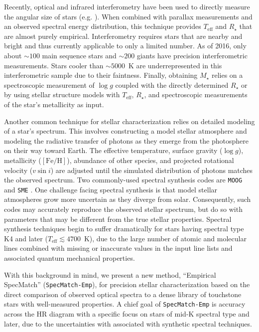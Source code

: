 \documentclass[preprint2]{aastex6}
\newcommand{\SpecMatch}{\texttt{SpecMatch-Emp}\xspace}
\newcommand{\Mstar}{\ensuremath{M_{\star}}\xspace}
\newcommand{\Rstar}{\ensuremath{R_{\star}}\xspace}
\newcommand{\fe}{\ensuremath{\mathrm{[Fe/H]}}\xspace}
\newcommand{\teff}{\ensuremath{T_{\mathrm{eff}}}\xspace}
\newcommand{\logg}{\ensuremath{\log g}\xspace}
\newcommand{\vsini}{\ensuremath{v \sin i}\xspace}
\begin{document}
Recently, optical and infrared interferometry have been used to directly measure the angular size of stars (e.g. \citealp{VonBraun14}). When combined with parallax measurements and an observed spectral energy distribution, this technique provides \teff and \Rstar that are almost purely empirical. Interferometry requires stars that are nearby and bright and thus currently applicable to only a limited number. As of 2016, only about $\sim100$ main sequence stars and $\sim200$ giants have precision interferometric measurements. Stars cooler than $\sim5000$~K are underrepresented in this interferometric sample due to their faintness. Finally, obtaining \Mstar relies on a spectroscopic measurement of \logg coupled with the directly determined \Rstar or by using stellar structure models with \teff, \Rstar, and spectroscopic measurements of the star's metallicity as input.

Another common technique for stellar characterization relies on detailed modeling of a star's spectrum. This involves constructing a model stellar atmosphere and modeling the radiative transfer of photons as they emerge from the photosphere on their way toward Earth. The effective temperature, surface gravity (\logg), metallicity (\fe), abundance of other species, and projected rotational velocity (\vsini) are adjusted until the simulated distribution of photons matches the observed spectrum. Two commonly-used spectral synthesis codes are {\tt MOOG} \citep{Sneden73} and {\tt SME} \citep{Valenti96,Valenti05,Brewer15}. One challenge facing spectral synthesis is that model stellar atmospheres grow more uncertain as they diverge from solar. Consequently, such codes may accurately reproduce the observed stellar spectrum, but do so with parameters that may be different from the true stellar properties. Spectral synthesis techniques begin to suffer dramatically for stars having spectral type K4 and later ($\teff \lesssim 4700$~K), due to the large number of atomic and molecular lines combined with missing or inaccurate values in the input line lists and associated quantum mechanical properties.

With this background in mind, we present a new method, ``Empirical SpecMatch'' (\SpecMatch), for precision stellar characterization based on the direct comparison of observed optical spectra to a dense library of touchstone stars with well-measured properties. A chief goal of \SpecMatch is accuracy across the HR diagram with a specific focus on stars of mid-K spectral type and later, due to the uncertainties with associated with synthetic spectral techniques.
\end{document}
